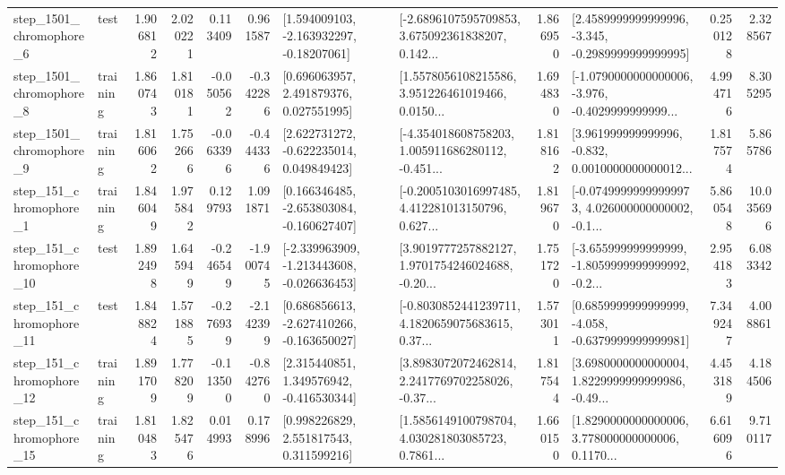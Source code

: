 \begin{tabular}{llrrrrllrlrr}
  step\_1501\_chromophore\_6 &      test &      1.906812 &    2.020221 &      0.113409 &  0.961587 &    [1.594009103, -2.163932297, -0.18207061] &  [-2.6896107595709853, 3.675092361838207, 0.142... &       1.866950 &  [2.4589999999999996, -3.345, -0.2989999999999995] &            0.250128 &          2.328567 \\
  step\_1501\_chromophore\_8 &  training &      1.860743 &    1.810181 &     -0.050562 & -0.342286 &     [0.696063957, 2.491879376, 0.027551995] &  [1.5578056108215586, 3.951226461019466, 0.0150... &       1.694830 &  [-1.0790000000000006, -3.976, -0.4029999999999... &            4.994716 &          8.305295 \\
  step\_1501\_chromophore\_9 &  training &      1.816062 &    1.752666 &     -0.063396 & -0.444336 &    [2.622731272, -0.622235014, 0.049849423] &  [-4.354018608758203, 1.005911686280112, -0.451... &       1.818162 &  [3.961999999999996, -0.832, 0.0010000000000012... &            1.817574 &          5.865786 \\
   step\_151\_chromophore\_1 &  training &      1.846049 &    1.975842 &      0.129793 &  1.091871 &   [0.166346485, -2.653803084, -0.160627407] &  [-0.2005103016997485, 4.412281013150796, 0.627... &       1.819670 &  [-0.07499999999999973, 4.026000000000002, -0.1... &            5.860548 &         10.035696 \\
  step\_151\_chromophore\_10 &      test &      1.892498 &    1.645949 &     -0.246549 & -1.900745 &  [-2.339963909, -1.213443608, -0.026636453] &  [3.9019777257882127, 1.9701754246024688, -0.20... &       1.751720 &  [-3.655999999999999, -1.8059999999999992, -0.2... &            2.954183 &          6.083342 \\
  step\_151\_chromophore\_11 &      test &      1.848824 &    1.571885 &     -0.276939 & -2.142399 &   [0.686856613, -2.627410266, -0.163650027] &  [-0.8030852441239711, 4.1820659075683615, 0.37... &       1.573011 &  [0.6859999999999999, -4.058, -0.6379999999999981] &            7.349247 &          4.008861 \\
  step\_151\_chromophore\_12 &  training &      1.891709 &    1.778209 &     -0.113500 & -0.842760 &    [2.315440851, 1.349576942, -0.416530344] &  [3.8983072072462814, 2.2417769702258026, -0.37... &       1.817544 &  [3.6980000000000004, 1.8229999999999986, -0.49... &            4.453189 &          4.184506 \\
  step\_151\_chromophore\_15 &  training &      1.810483 &    1.825476 &      0.014993 &  0.178996 &     [0.998226829, 2.551817543, 0.311599216] &  [1.5856149100798704, 4.030281803085723, 0.7861... &       1.660150 &  [1.8290000000000006, 3.778000000000006, 0.1170... &            6.616096 &          9.710117 \\

\end{tabular}
